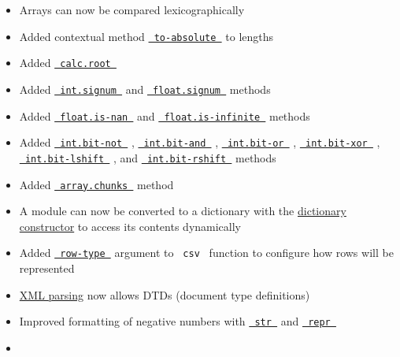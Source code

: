 \begin{itemize}
\tightlist
\item
  Arrays can now be compared lexicographically
\item
  Added contextual method
  \href{/docs/reference/layout/length/\#definitions-to-absolute}{\texttt{\ to-absolute\ }}
  to lengths
\item
  Added
  \href{/docs/reference/foundations/calc/\#functions-root}{\texttt{\ calc.root\ }}
\item
  Added
  \href{/docs/reference/foundations/int/\#definitions-signum}{\texttt{\ int.signum\ }}
  and
  \href{/docs/reference/foundations/float/\#definitions-signum}{\texttt{\ float.signum\ }}
  methods
\item
  Added
  \href{/docs/reference/foundations/float/\#definitions-is-nan}{\texttt{\ float.is-nan\ }}
  and
  \href{/docs/reference/foundations/float/\#definitions-is-infinite}{\texttt{\ float.is-infinite\ }}
  methods
\item
  Added
  \href{/docs/reference/foundations/int/\#definitions-bit-not}{\texttt{\ int.bit-not\ }}
  ,
  \href{/docs/reference/foundations/int/\#definitions-bit-and}{\texttt{\ int.bit-and\ }}
  ,
  \href{/docs/reference/foundations/int/\#definitions-bit-or}{\texttt{\ int.bit-or\ }}
  ,
  \href{/docs/reference/foundations/int/\#definitions-bit-xor}{\texttt{\ int.bit-xor\ }}
  ,
  \href{/docs/reference/foundations/int/\#definitions-bit-lshift}{\texttt{\ int.bit-lshift\ }}
  , and
  \href{/docs/reference/foundations/int/\#definitions-bit-rshift}{\texttt{\ int.bit-rshift\ }}
  methods
\item
  Added
  \href{/docs/reference/foundations/array/\#definitions-chunks}{\texttt{\ array.chunks\ }}
  method
\item
  A module can now be converted to a dictionary with the
  \href{/docs/reference/foundations/dictionary/\#constructor}{dictionary
  constructor} to access its contents dynamically
\item
  Added
  \href{/docs/reference/data-loading/csv/\#parameters-row-type}{\texttt{\ row-type\ }}
  argument to \texttt{\ csv\ } function to configure how rows will be
  represented
\item
  \href{/docs/reference/data-loading/xml/}{XML parsing} now allows DTDs
  (document type definitions)
\item
  Improved formatting of negative numbers with
  \href{/docs/reference/foundations/str/}{\texttt{\ str\ }} and
  \href{/docs/reference/foundations/repr/}{\texttt{\ repr\ }}
\item

\end{itemize}

